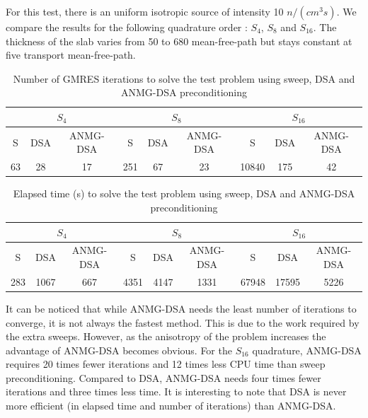 \documentclass[preprint,10pt]{elsarticle}
\renewcommand{\(}{\left(}
\renewcommand{\)}{\right)}
\renewcommand{\[}{\left[}
\renewcommand{\]}{\right]}
\begin{document}
For this test, there is an uniform isotropic source of intensity 10 $n/(cm^3s)$. 
We compare the results for the following quadrature order : $S_4$, $S_8$ and 
$S_{16}$. The thickness of the slab varies from
50 to 680 mean-free-path but stays constant at five transport mean-free-path.
\begin{table}[H]
\begin{center}
\begin{tabular}{|c|c|c|c|c|c|c|c|c|}
\hline
\multicolumn{3}{|c|}{$S_4$} & \multicolumn{3}{c|}{$S_8$} & 
\multicolumn{3}{c|}{$S_{16}$} \\
\hline  
S & DSA & ANMG-DSA & S & DSA & ANMG-DSA & S & DSA & ANMG-DSA\\
\hline
63 & 28 & 17 & 251 & 67 & 23 & 10840 & 175 & 42 \\
\hline
\end{tabular}
\caption{Number of GMRES iterations to solve the test problem using sweep, DSA
and ANMG-DSA preconditioning}
\label{tab:2}
\end{center}
\end{table}
%
%
\begin{table}[H]
\begin{center}
\begin{tabular}{|c|c|c|c|c|c|c|c|c|}
\hline
\multicolumn{3}{|c|}{$S_4$} & \multicolumn{3}{c|}{$S_8$} & 
\multicolumn{3}{c|}{$S_{16}$} \\
\hline  
S & DSA & ANMG-DSA & S & DSA & ANMG-DSA & S & DSA & ANMG-DSA\\
\hline
283 & 1067 & 667 & 4351 & 4147 & 1331 & 67948 & 17595 & 5226 \\
\hline
\end{tabular}
\caption{Elapsed time (s) to solve the test problem using sweep, DSA and
ANMG-DSA preconditioning}
\label{tab:3}
\end{center}
\end{table}
It can be noticed that while ANMG-DSA needs the least number of iterations to converge, it is
not always the fastest method. This is due to the work required by the extra
sweeps. However, as the anisotropy of the problem increases the advantage of
ANMG-DSA becomes obvious. For the $S_{16}$ quadrature, ANMG-DSA requires 20 times 
fewer iterations and 12 times less CPU time than sweep preconditioning. 
Compared to DSA, ANMG-DSA needs four times fewer iterations and three times less 
time. It is interesting to note that DSA is never more efficient (in elapsed
time and number of iterations) than ANMG-DSA.

\end{document}
